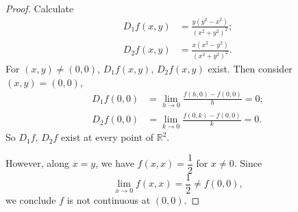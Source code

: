 \begin{Exercise}
	\begin{proof}
		Calculate 
		\begin{align*}
		D_1 f(x,y)
		&= \frac{y(y^2-x^2)}{(x^2+y^2)^2}; \\
		D_2 f(x,y)
		&= \frac{x(x^2-y^2)}{(x^2+y^2)^2}.
		\end{align*}
		For $(x,y)\neq (0,0)$, $D_1 f(x,y)$, $D_2 f(x,y)$ exist.
		Then consider $(x,y) = (0,0)$,
		\begin{align*}
		D_1 f(0,0)
		&= \lim_{h\to 0}\frac{f(h,0)-f(0,0)}{h}
		= 0; \\
		D_2 f(0,0)
		&= \lim_{k\to 0}\frac{f(0,k)-f(0,0)}{k}
		= 0.
		\end{align*}
		So $D_1 f$, $D_2 f$ exist at every point of $\mathbb{R}^2$.
		
		However, along $x = y$, we have $f(x,x) = \dfrac{1}{2}$ for $x\neq 0$.
		Since
		$$
		\lim_{x\to 0} f(x,x) = \frac{1}{2} \neq f(0,0),
		$$
		we conclude $f$ is not continuous at $(0,0)$.
	\end{proof}
\end{Exercise}